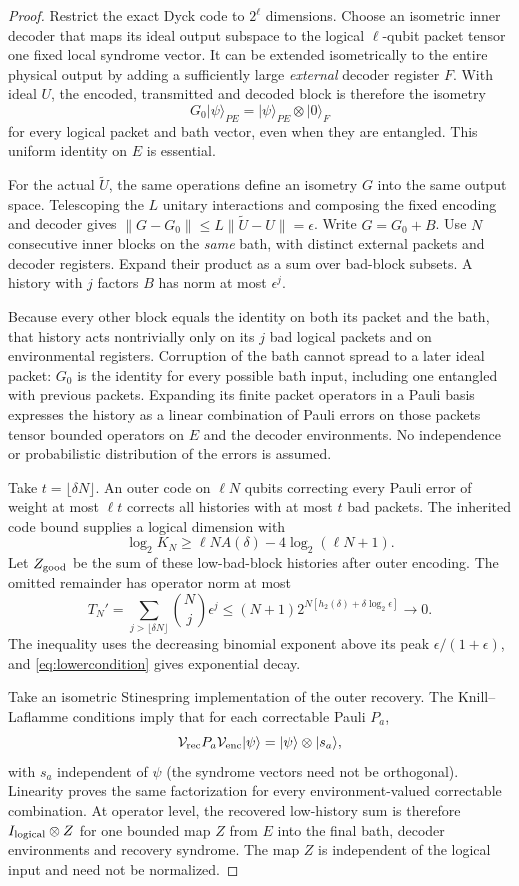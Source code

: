 \documentclass[11pt]{article}
\newcommand{\ket}[1]{\lvert #1\rangle}
\newcommand{\norm}[1]{\lVert #1\rVert}
\begin{document}
\begin{proof}
Restrict the exact Dyck code to $2^\ell$ dimensions. Choose an isometric inner decoder that maps its ideal output subspace to the logical $\ell$-qubit packet tensor one fixed local syndrome vector. It can be extended isometrically to the entire physical output by adding a sufficiently large \emph{external} decoder register $F$. With ideal $U$, the encoded, transmitted and decoded block is therefore the isometry
\[
 G_0\ket\psi_{PE}=\ket\psi_{PE}\otimes\ket0_F
\]
for every logical packet and bath vector, even when they are entangled. This uniform identity on $E$ is essential.

For the actual $\widetilde U$, the same operations define an isometry $G$ into the same output space. Telescoping the $L$ unitary interactions and composing the fixed encoding and decoder gives
$\norm{G-G_0}\le L\norm{\widetilde U-U}=\epsilon$.
Write $G=G_0+B$. Use $N$ consecutive inner blocks on the \emph{same} bath, with distinct external packets and decoder registers. Expand their product as a sum over bad-block subsets. A history with $j$ factors $B$ has norm at most $\epsilon^j$.

Because every other block equals the identity on both its packet and the bath, that history acts nontrivially only on its $j$ bad logical packets and on environmental registers. Corruption of the bath cannot spread to a later ideal packet: $G_0$ is the identity for every possible bath input, including one entangled with previous packets. Expanding its finite packet operators in a Pauli basis expresses the history as a linear combination of Pauli errors on those packets tensor bounded operators on $E$ and the decoder environments. No independence or probabilistic distribution of the errors is assumed.

Take $t=\lfloor\delta N\rfloor$. An outer code on $\ell N$ qubits correcting every Pauli error of weight at most $\ell t$ corrects all histories with at most $t$ bad packets. The inherited code bound supplies a logical dimension with
\[
 \log_2K_N\ge\ell N A(\delta)-4\log_2(\ell N+1).
\]
Let $Z_{\rm good}$ be the sum of these low-bad-block histories after outer encoding. The omitted remainder has operator norm at most
\[
 T_N'=\sum_{j>\lfloor\delta N\rfloor}\binom Nj\epsilon^j
 \le(N+1)2^{N[h_2(\delta)+\delta\log_2\epsilon]}\longrightarrow0.
\]
The inequality uses the decreasing binomial exponent above its peak $\epsilon/(1+\epsilon)$, and \eqref{eq:lowercondition} gives exponential decay.

Take an isometric Stinespring implementation of the outer recovery. The Knill--Laflamme conditions imply that for each correctable Pauli $P_a$,
\[
 \mathcal V_{\rm rec}P_a\mathcal V_{\rm enc}\ket\psi
 =\ket\psi\otimes\ket{s_a},
\]
with $s_a$ independent of $\psi$ (the syndrome vectors need not be orthogonal). Linearity proves the same factorization for every environment-valued correctable combination. At operator level, the recovered low-history sum is therefore $I_{\rm logical}\otimes Z$ for one bounded map $Z$ from $E$ into the final bath, decoder environments and recovery syndrome. The map $Z$ is independent of the logical input and need not be normalized.


\end{proof}
\end{document}
